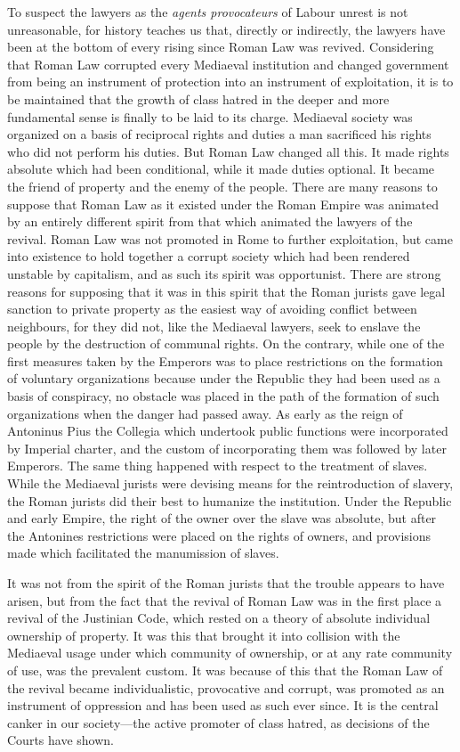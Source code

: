 \documentclass{book}
\begin{document}
To suspect the lawyers as the \emph{agents provocateurs} of Labour unrest is not unreasonable, for history teaches us that, directly or indirectly, the lawyers have been at the bottom of every rising since Roman Law was revived. Considering that Roman Law corrupted every Mediaeval institution and changed government from being an instrument of protection into an instrument of exploitation, it is to be maintained that the growth of class hatred in the deeper and more fundamental sense is finally to be laid to its charge. Mediaeval society was organized on a basis of reciprocal rights and duties a man sacrificed his rights who did not perform his duties. But Roman Law changed all this. It made rights absolute which had been conditional, while it made duties optional. It became the friend of property and the enemy of the people. There are many reasons to suppose that Roman Law as it existed under the Roman Empire was animated by an entirely different spirit from that which animated the lawyers of the revival. Roman Law was not promoted in Rome to further exploitation, but came into existence to hold together a corrupt society which had been rendered unstable by capitalism, and as such its spirit was opportunist. There are strong reasons for supposing that it was in this spirit that the Roman jurists gave legal sanction to private property as the easiest way of avoiding conflict between neighbours, for they did not, like the Mediaeval lawyers, seek to enslave the people by the destruction of communal rights. On the contrary, while one of the first measures taken by the Emperors was to place restrictions on the formation of voluntary organizations because under the Republic they had been used as a basis of conspiracy, no obstacle was placed in the path of the formation of such organizations when the danger had passed away. As early as the reign of Antoninus Pius the Collegia which undertook public functions were incorporated by Imperial charter, and the custom of incorporating them was followed by later Emperors. The same thing happened with respect to the treatment of slaves. While the Mediaeval jurists were devising means for the reintroduction of slavery, the Roman jurists did their best to humanize the institution. Under the Republic and early Empire, the right of the owner over the slave was absolute, but after the Antonines restrictions were placed on the rights of owners, and provisions made which facilitated the manumission of slaves.

It was not from the spirit of the Roman jurists that the trouble appears to have arisen, but from the fact that the revival of Roman Law was in the first place a revival of the Justinian Code, which rested on a theory of absolute individual ownership of property. It was this that brought it into collision with the Mediaeval usage under which community of ownership, or at any rate community of use, was the prevalent custom. It was because of this that the Roman Law of the revival became individualistic, provocative and corrupt, was promoted as an instrument of oppression and has been used as such ever since. It is the central canker in our society—the active promoter of class hatred, as decisions of the Courts have shown.
\end{document}
